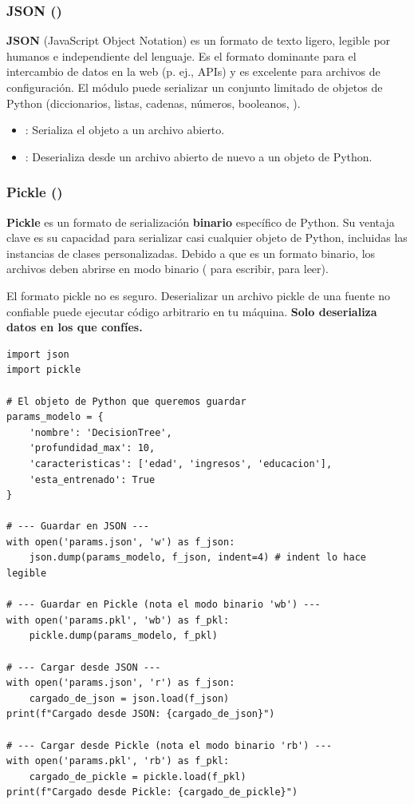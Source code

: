 \subsubsection*{JSON ()}
\textbf{JSON} (JavaScript Object Notation) es un formato de texto ligero, legible por humanos e independiente del lenguaje. Es el formato dominante para el intercambio de datos en la web (p. ej., APIs) y es excelente para archivos de configuración. El módulo  puede serializar un conjunto limitado de objetos de Python (diccionarios, listas, cadenas, números, booleanos, ).
\begin{itemize}
    \item {}: Serializa el objeto a un archivo abierto.
    \item {}: Deserializa desde un archivo abierto de nuevo a un objeto de Python.
\end{itemize}

\subsubsection*{Pickle ()}
\textbf{Pickle} es un formato de serialización \textbf{binario} específico de Python. Su ventaja clave es su capacidad para serializar casi cualquier objeto de Python, incluidas las instancias de clases personalizadas. Debido a que es un formato binario, los archivos deben abrirse en modo binario ( para escribir,  para leer).

\begin{remark}
El formato pickle no es seguro. Deserializar un archivo pickle de una fuente no confiable puede ejecutar código arbitrario en tu máquina. \textbf{Solo deserializa datos en los que confíes.}
\end{remark}

\begin{example}
\text{ }\begin{verbatim}
import json
import pickle

# El objeto de Python que queremos guardar
params_modelo = {
    'nombre': 'DecisionTree',
    'profundidad_max': 10,
    'caracteristicas': ['edad', 'ingresos', 'educacion'],
    'esta_entrenado': True
}

# --- Guardar en JSON ---
with open('params.json', 'w') as f_json:
    json.dump(params_modelo, f_json, indent=4) # indent lo hace legible

# --- Guardar en Pickle (nota el modo binario 'wb') ---
with open('params.pkl', 'wb') as f_pkl:
    pickle.dump(params_modelo, f_pkl)

# --- Cargar desde JSON ---
with open('params.json', 'r') as f_json:
    cargado_de_json = json.load(f_json)
print(f"Cargado desde JSON: {cargado_de_json}")

# --- Cargar desde Pickle (nota el modo binario 'rb') ---
with open('params.pkl', 'rb') as f_pkl:
    cargado_de_pickle = pickle.load(f_pkl)
print(f"Cargado desde Pickle: {cargado_de_pickle}")
\end{verbatim}
\end{example}

